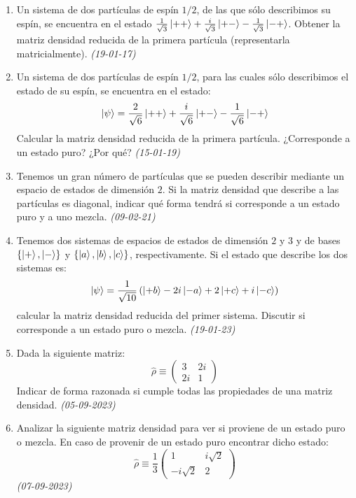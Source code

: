 \begin{enumerate}
    \item Un sistema de dos partículas de espín $1/2$, de las que sólo describimos su espín, se encuentra en el estado $\frac{1}{\sqrt{3}} \ket{++} + \frac{i}{\sqrt{3}} \ket{+-} - \frac{1}{\sqrt{3}} \ket{-+}$. Obtener la matriz densidad reducida de la primera partícula (representarla matricialmente). \textit{(19-01-17)}

    \item Un sistema de dos partículas de espín $1/2$, para las cuales sólo describimos el estado de su espín, se encuentra en el estado:
    \[
    \ket{\psi} = \frac{2}{\sqrt{6}} \ket{++} + \frac{i}{\sqrt{6}} \ket{+-} - \frac{1}{\sqrt{6}} \ket{-+}
    \]
    Calcular la matriz densidad reducida de la primera partícula. ¿Corresponde a un estado puro? ¿Por qué? \textit{(15-01-19)}

    \item Tenemos un gran número de partículas que se pueden describir mediante un espacio de estados de dimensión $2$. Si la matriz densidad que describe a las partículas es diagonal, indicar qué forma tendrá si corresponde a un estado puro y a uno mezcla. \textit{(09-02-21)}

    \item Tenemos dos sistemas de espacios de estados de dimensión $2$ y $3$ y de bases $\{\ket{+}, \ket{-}\}$ y $\{\ket{a}, \ket{b}, \ket{c}\}$, respectivamente. Si el estado que describe los dos sistemas es:
    \[
    \ket{\psi} = \frac{1}{\sqrt{10}} \left( \ket{+b} - 2i \ket{-a} + 2 \ket{+c} + i \ket{-c} \right)
    \]
    calcular la matriz densidad reducida del primer sistema. Discutir si corresponde a un estado puro o mezcla. \textit{(19-01-23)}

    \item Dada la siguiente matriz:
    \[
    \hat{\rho} \equiv \begin{pmatrix} 3 & 2i \\ 2i & 1 \end{pmatrix}
    \]
    Indicar de forma razonada si cumple todas las propiedades de una matriz densidad. \textit{(05-09-2023)}

    \item Analizar la siguiente matriz densidad para ver si proviene de un estado puro o mezcla. En caso de provenir de un estado puro encontrar dicho estado:
    \[
    \hat{\rho} \equiv \frac{1}{3} \begin{pmatrix} 1 & i \sqrt{2} \\ -i \sqrt{2} & 2 \end{pmatrix}
    \] \textit{(07-09-2023)}


\end{enumerate}
